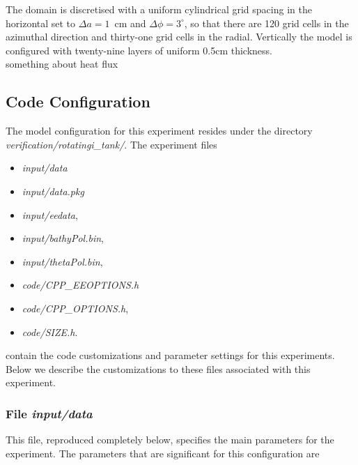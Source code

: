  The domain is discretised with 
a uniform cylindrical grid spacing in the horizontal set to
 $\Delta a=1$~cm and $\Delta \phi=3^{\circ}$, so 
that there are 120 grid cells in the azimuthal direction and thirty-one grid cells in the radial. Vertically the 
model is configured with twenty-nine layers of uniform 0.5cm thickness.
\\
something about heat flux

\subsection{Code Configuration}
\label{www:tutorials}
\label{SEC:eg-baro-code_config}

The model configuration for this experiment resides under the
directory {\it verification/rotatingi\_tank/}.  The experiment files
\begin{itemize}
\item {\it input/data}
\item {\it input/data.pkg}
\item {\it input/eedata},
\item {\it input/bathyPol.bin},
\item {\it input/thetaPol.bin},
\item {\it code/CPP\_EEOPTIONS.h}
\item {\it code/CPP\_OPTIONS.h},
\item {\it code/SIZE.h}.
\end{itemize}

contain the code customizations and parameter settings for this 
experiments. Below we describe the customizations
to these files associated with this experiment.

\subsubsection{File {\it input/data}}
\label{www:tutorials}

This file, reproduced completely below, specifies the main parameters 
for the experiment. The parameters that are significant for this configuration
are

